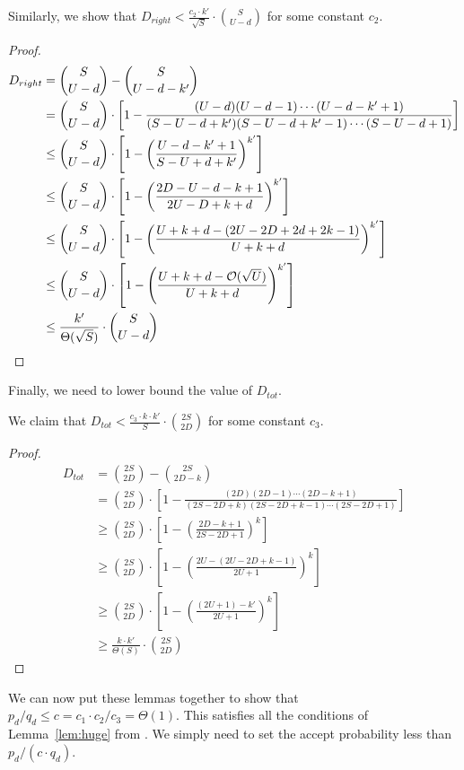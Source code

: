 \begin{lemma}
Similarly, we show that $D_{right} < \frac{c_2\cdot k'}{\sqrt{S}}\cdot{{S}\choose{U-d}}$ for some constant $c_2$.
\end{lemma}
\begin{proof}
\begin{align}
D_{right} &= {{S}\choose{U-d}}-{{S}\choose{U-d-k'}}\\
&= {{S}\choose{U-d}}\cdot \left[1-\frac{(U-d)(U-d-1)\cdots(U-d-k'+1)}{(S-U-d+k')(S-U-d+k'-1)\cdots(S-U-d+1)}\right]\\
&\le {{S}\choose{U-d}}\cdot \left[1-\left(\frac{U-d-k'+1}{S-U+d+k'}\right)^{k'}\right]\\
&\le {{S}\choose{U-d}}\cdot \left[1-\left(\frac{2D-U-d-k+1}{2U-D+k+d}\right)^{k'}\right]\\
&\le {{S}\choose{U-d}}\cdot \left[1-\left(\frac{U+k+d - (2U-2D+2d+2k-1)}{U+k+d}\right)^{k'}\right]\\
&\le {{S}\choose{U-d}}\cdot \left[1-\left(\frac{U+k+d - \Bo(\sqrt U)}{U+k+d}\right)^{k'}\right]\\
&\le \frac{k'}{\Theta(\sqrt{S})}\cdot{{S}\choose{U-d}}
\end{align}
\end{proof}

Finally, we need to lower bound the value of $D_{tot}$.

\begin{lemma}
We claim that $D_{tot} < \frac{c_3\cdot k\cdot k'}{S}\cdot{{2S}\choose{2D}}$ for some constant $c_3$.
\end{lemma}
\begin{proof}
\begin{align}
D_{tot} &= {{2S}\choose{2D}}-{{2S}\choose{2D-k}}\\
&= {{2S}\choose{2D}}\cdot \left[1-\frac{(2D)(2D-1)\cdots(2D-k+1)}{(2S-2D+k)(2S-2D+k-1)\cdots(2S-2D+1)}\right]\\
&\ge {{2S}\choose{2D}}\cdot \left[1-\left(\frac{2D-k+1}{2S-2D+1}\right)^k\right]\\
&\ge {{2S}\choose{2D}}\cdot \left[1-\left(\frac{2U-(2U-2D+k-1)}{2U+1}\right)^k\right]\\
&\ge {{2S}\choose{2D}}\cdot \left[1-\left(\frac{(2U+1)-k'}{2U+1}\right)^k\right]\\
&\ge \frac{k\cdot k'}{\Theta(S)}\cdot{{2S}\choose{2D}}
\end{align}
\end{proof}

\begin{theorem}
We can now put these lemmas together to show that $p_d/q_d \le c = c_1\cdot c_2/c_3 = \Theta(1)$.
This satisfies all the conditions of Lemma~\ref{lem:huge} from \cite{huge}.
We simply need to set the accept probability less than $p_d/(c\cdot q_d)$.
\end{theorem}
